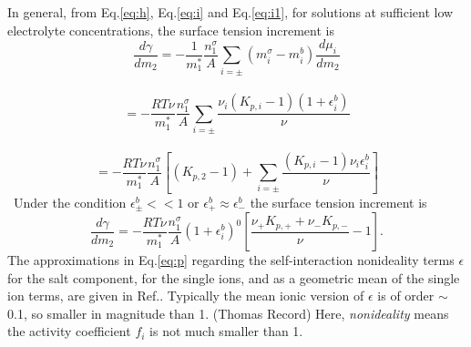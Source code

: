 In general, from Eq.\thinspace\ref{eq:h}, Eq.\thinspace\ref{eq:i} and Eq.\thinspace\ref{eq:i1}, for solutions at sufficient low electrolyte concentrations, the surface tension increment is 
\begin{equation}
\frac{d\gamma}{dm_2} = -\frac{1}{m_1^*}\frac{n_1^{\sigma}}{A}\sum_{i=\pm}(m_i^{\sigma} -m_{i}^{b})\frac{d\mu_i}{dm_2} \nonumber
\label{eq:gamma_m2}
\end{equation}\
\begin{equation}
= -\frac{RT\nu}{m_1^*}\frac{n_1^{\sigma}}{A}\sum_{i=\pm} \frac{{\nu_i}(K_{p,i}-1)(1+\epsilon_i^b)}{\nu} \nonumber
\label{eq:l}
\end{equation}\
\begin{equation}
= -\frac{RT\nu}{m_1^*}\frac{n_1^{\sigma}}{A}[(K_{p,2}-1)+\sum_{i=\pm} \frac{(K_{p,i}-1)\nu_i\epsilon_i^b}{\nu}]
\label{eq:n}
\end{equation}\
Under the condition $\epsilon_{\pm}^b << 1$ or $\epsilon_{+}^b \approx \epsilon_{-}^b$
the surface tension increment is 
\begin{equation}
\frac{d\gamma}{dm_2} 
= -\frac{RT\nu}{m_1^*}\frac{n_1^{\sigma}}{A} (1+\epsilon_i^b)^0 [\frac{\nu_+ K_{p,+} + \nu_- K_{p,-}}{\nu}-1].
\label{eq:p}
\end{equation}
The approximations in Eq.\thinspace\ref{eq:p} regarding the self-interaction {nonideality terms} $\epsilon$ for the salt component, 
for the single ions, and as a geometric mean of the single ion terms, are given in Ref.\cite{Pegram2006}.  
Typically the mean ionic version of $\epsilon$ is of order $\sim$ 0.1, so smaller in magnitude than 1. (Thomas Record)
Here, \emph{nonideality} means the activity coefficient $f_i$ is not much smaller than 1.
%
%
%
%


